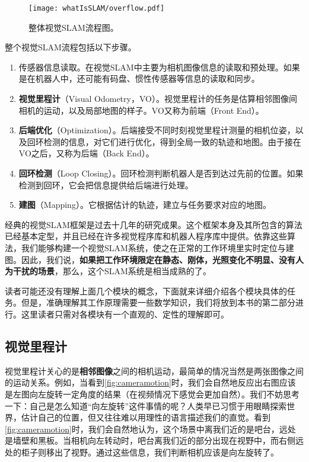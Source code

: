 \begin{figure}[!htp]
	\centering
	\texttt{[image: whatIsSLAM/overflow.pdf]}
	\caption{整体视觉SLAM流程图。}
	\label{fig:overflow}
\end{figure}

整个视觉SLAM流程包括以下步骤。
\begin{enumerate}
	\item 传感器信息读取。在视觉SLAM中主要为相机图像信息的读取和预处理。如果是在机器人中，还可能有码盘、惯性传感器等信息的读取和同步。
	\item \textbf{视觉里程计}（Visual Odometry，VO）。视觉里程计的任务是估算相邻图像间相机的运动，以及局部地图的样子。VO又称为前端（Front End）。
	\item \textbf{后端优化}（Optimization）。后端接受不同时刻视觉里程计测量的相机位姿，以及回环检测的信息，对它们进行优化，得到全局一致的轨迹和地图。由于接在VO之后，又称为后端（Back End）。
	\item \textbf{回环检测}（Loop Closing）。回环检测判断机器人是否到达过先前的位置。如果检测到回环，它会把信息提供给后端进行处理。
	\item \textbf{建图}（Mapping）。它根据估计的轨迹，建立与任务要求对应的地图。
\end{enumerate}

经典的视觉SLAM框架是过去十几年的研究成果。这个框架本身及其所包含的算法已经基本定型，并且已经在许多视觉程序库和机器人程序库中提供。依靠这些算法，我们能够构建一个视觉SLAM系统，使之在正常的工作环境里实时定位与建图。因此，我们说，\textbf{如果把工作环境限定在静态、刚体，光照变化不明显、没有人为干扰的场景}，那么，这个SLAM系统是相当成熟的了\textsuperscript{\cite{Cadena2016}}。

读者可能还没有理解上面几个模块的概念，下面就来详细介绍各个模块具体的任务。但是，准确理解其工作原理需要一些数学知识，我们将放到本书的第二部分进行。这里读者只需对各模块有一个直观的、定性的理解即可。

\subsection{视觉里程计}
视觉里程计关心的是\textbf{相邻图像}之间的相机运动，最简单的情况当然是两张图像之间的运动关系。例如，当看到\autoref{fig:cameramotion}时，我们会自然地反应出右图应该是左图向左旋转一定角度的结果（在视频情况下感觉会更加自然）。我们不妨思考一下：自己是怎么知道“向左旋转”这件事情的呢？人类早已习惯于用眼睛探索世界，估计自己的位置，但又往往难以用理性的语言描述我们的直觉。看到\autoref{fig:cameramotion}时，我们会自然地认为，这个场景中离我们近的是吧台，远处是墙壁和黑板。当相机向左转动时，吧台离我们近的部分出现在视野中，而右侧远处的柜子则移出了视野。通过这些信息，我们判断相机应该是向左旋转了。

